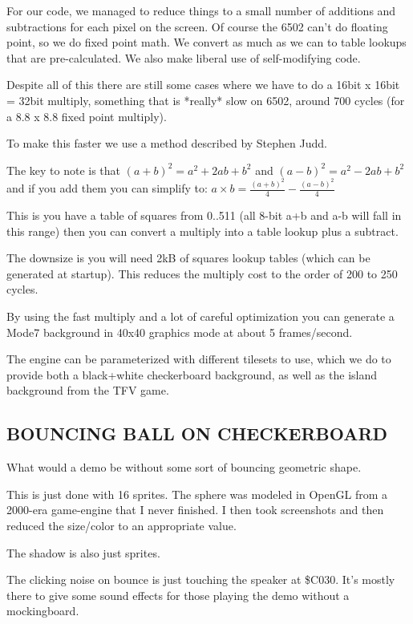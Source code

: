 \documentclass[twocolumn]{article}
\begin{document}
  For our code, we managed to reduce things to a small number of additions
  and subtractions for each pixel on the screen.  Of course the 6502 can't
  do floating point, so we do fixed point math.  We convert as much as we
  can to table lookups that are pre-calculated.  We also make liberal use
  of self-modifying code.

  Despite all of this there are still some cases where we have to do a 
  16bit x 16bit = 32bit multiply, something that is *really* slow on 6502,
  around 700 cycles (for a 8.8 x 8.8 fixed point multiply).

  To make this faster we use a method described by Stephen Judd.

  The key to note is that $(a+b)^{2} = a^{2}+2ab+b^{2}$ 
	and $(a-b)^{2}=a^{2}-2ab+b^{2}$
  and if you add them you can simplify to:
	$a\times b =\frac{(a+b)^{2}}{4} - \frac{(a-b)^2}{4}$

  This is you have a table of squares from 0..511 (all 8-bit a+b and a-b
  will fall in this range) then you can convert a multiply into a table
  lookup plus a subtract.

  The downsize is you will need 2kB of squares lookup tables (which can
  be generated at startup).  This reduces the multiply cost to the order
  of 200 to 250 cycles.

  By using the fast multiply and a lot of careful optimization you can
  generate a Mode7 background in 40x40 graphics mode at about 5 frames/second.

  The engine can be parameterized with different tilesets to use, which we
  do to provide both a black+white checkerboard background, as well as the
  island background from the TFV game.

\subsection{BOUNCING BALL ON CHECKERBOARD}

  What would a demo be without some sort of bouncing geometric shape.

  This is just done with 16 sprites.  The sphere was modeled in OpenGL
  from a 2000-era game-engine that I never finished.  I then took screenshots
  and then reduced the size/color to an appropriate value.

  The shadow is also just sprites.

  The clicking noise on bounce is just touching the speaker at \$C030.
  It's mostly there to give some sound effects for those playing the demo
  without a mockingboard.
\end{document}

